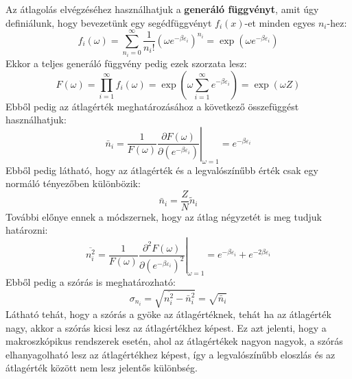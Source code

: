 \documentclass[../main.tex]{subfiles}
\begin{document}
Az átlagolás elvégzéséhez használhatjuk a \textbf{generáló függvényt}, amit úgy definiálunk, hogy bevezetünk egy segédfüggvényt $f_i(x)$-et minden egyes $n_i$-hez:
\begin{equation}
    f_i(\omega) = \sum_{n_i = 0}^\infty \frac{1}{n_i!} (\omega e^{- \beta \varepsilon_i})^{n_i} = \exp(\omega e^{- \beta \varepsilon_i})
\end{equation}
Ekkor a teljes generáló függvény pedig ezek szorzata lesz:
\begin{equation}
    F(\omega) = \prod_{i = 1}^\infty f_i(\omega) = \exp \left( \omega \sum_{i = 1}^\infty e^{- \beta \varepsilon_i} \right) = \exp (\omega Z)
\end{equation}
Ebből pedig az átlagérték meghatározásához a következő összefüggést használhatjuk:
\begin{equation}
    \bar{n}_i = \left. \frac{1}{F(\omega)} \frac{\partial F(\omega)}{\partial (e^{- \beta \varepsilon_i})} \right|_{\omega = 1} = e^{- \beta \varepsilon_i} 
\end{equation}
Ebből pedig látható, hogy az átlagérték és a legvalószínűbb érték csak egy normáló tényezőben különbözik:
\begin{equation}
    \bar{n}_i = \frac{Z}{N} \tilde{n}_i
\end{equation}
További előnye ennek a módszernek, hogy az átlag négyzetét is meg tudjuk határozni:
\begin{equation}
    \overline{n_i^2} = \left. \frac{1}{F(\omega)} \frac{\partial^2 F(\omega)}{\partial (e^{- \beta \varepsilon_i})^2} \right|_{\omega = 1} = e^{- \beta \varepsilon_i} + e^{- 2 \beta \varepsilon_i} 
\end{equation}
Ebből pedig a szórás is meghatározható:
\begin{equation}
    \sigma_{n_i} = \sqrt{\overline{n_i^2} - \bar{n}_i^2} = \sqrt{\bar{n}_i}
\end{equation}
Látható tehát, hogy a szórás a gyöke az átlagértéknek, tehát ha az átlagérték nagy, akkor a szórás kicsi lesz az átlagértékhez képest.
Ez azt jelenti, hogy a makroszkópikus rendszerek esetén, ahol az átlagértékek nagyon nagyok, a szórás elhanyagolható lesz az átlagértékhez képest, így a legvalószínűbb eloszlás és az átlagérték között
nem lesz jelentős különbség.
\end{document}
